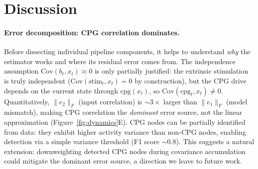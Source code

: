 \documentclass{article}
\begin{document}
\section{Discussion}
\label{sec:discussion}

\paragraph{Error decomposition: CPG correlation dominates.}
Before dissecting individual pipeline components, it helps to understand \emph{why} the estimator works and where its residual error comes from.
The independence assumption $\text{Cov}(b_t, x_t) \approx 0$ is only partially justified: the extrinsic stimulation is truly independent ($\text{Cov}(\text{stim}_t, x_t) = 0$ by construction), but the CPG drive depends on the current state through $\text{cpg}(x_t)$, so $\text{Cov}(\text{cpg}_t, x_t) \neq 0$.
Quantitatively, $\|e_2\|_F$ (input correlation) is ${\sim}3\times$ larger than $\|e_1\|_F$ (model mismatch), making CPG correlation the \emph{dominant} error source, not the linear approximation (Figure~\ref{fig:dynamics}E).
CPG nodes can be partially identified from data: they exhibit higher activity variance than non-CPG nodes, enabling detection via a simple variance threshold (F1 score $\sim 0.8$).
This suggests a natural extension: downweighting detected CPG nodes during covariance accumulation could mitigate the dominant error source, a direction we leave to future work.
\end{document}
